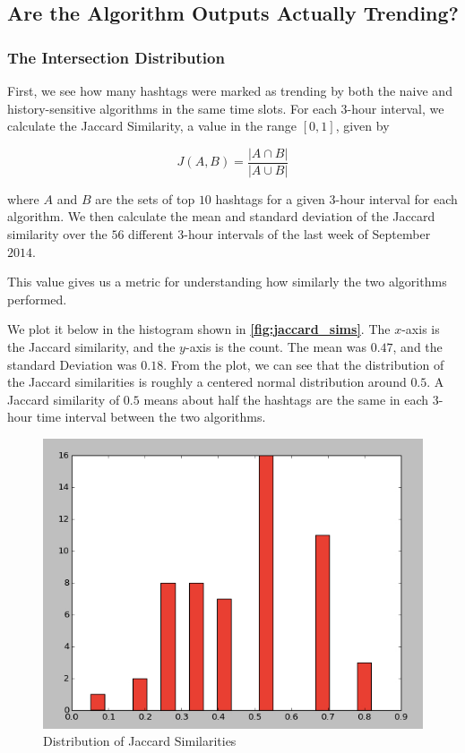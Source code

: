 \documentclass[twoside]{article}
\newcommand{\aref}[1]
 {\textbf{\autoref{#1}}}
\begin{document}
{\subsection{Are the Algorithm Outputs Actually Trending?}

\subsubsection{The Intersection Distribution}

First, we see how many hashtags were marked as trending 
by both the naive and history-sensitive algorithms in the same time slots.
For each $3$-hour interval, we calculate the Jaccard Similarity, a value
in the range $[0, 1]$, given by 

\begin{equation}
\label{eq:jaccard}
J(A, B) = \frac{|A \cap B|}{|A \cup B|}
\end{equation}

\noindent where $A$ and $B$ are the sets of top $10$ hashtags for a given $3$-hour interval
for each algorithm. 
We then calculate the mean and standard deviation of the Jaccard similarity
over the $56$ different $3$-hour intervals of the last week of September $2014$.

This value gives us a metric for understanding how similarly the two algorithms performed.

We plot it below in the histogram shown in \aref{fig:jaccard_sims}. The $x$-axis is the Jaccard similarity, and the $y$-axis is the count. The mean was $0.47$, and the standard Deviation was $0.18$. From the plot, we can see that the distribution of the Jaccard similarities is roughly a centered normal distribution around $0.5$. A Jaccard similarity of $0.5$ means about half the hashtags are the same in each $3$-hour time interval between the two algorithms. 

\begin{figure}
\centering
\includegraphics[scale = .4]{jaccard_sims}
\caption{Distribution of Jaccard Similarities}
\label{fig:jaccard_sims}
\end{figure}

}
\end{document}
